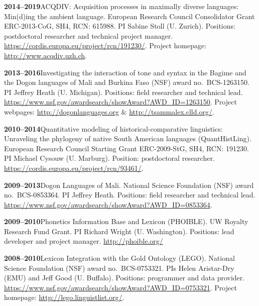 \documentclass[11pt]{article}
\newcommand{\hangpara}{
 \setlength{\parindent}{0in} %
 \hangindent=0.42in %
}
\begin{document}
\vskip 6pt
\hangpara
{\bf 2014--2019}\hspace{1ex}ACQDIV: Acquisition processes in maximally diverse languages: Min(d)ing the ambient language. European Research Council Consolidator Grant ERC-2013-CoG, SH4, RCN: 615988. PI Sabine Stoll (U. Zurich). Positions: postdoctoral researcher and technical project manager. \url{https://cordis.europa.eu/project/rcn/191230/}. Project homepage: \url{http://www.acqdiv.uzh.ch}. %

\vskip 6pt
\hangpara
{\bf 2013--2016}\hspace{1ex}Investigating the interaction of tone and syntax in the Bagime and the Dogon languages of Mali and Burkina Faso (NSF) award no.\ BCS-1263150. PI Jeffrey Heath (U. Michigan). Positions: field researcher and technical lead. \url{https://www.nsf.gov/awardsearch/showAward?AWD_ID=1263150}. Project webpages: \url{http://dogonlanguages.org} \& \url{http://tsammalex.clld.org/}.

\vskip 6pt
\hangpara
{\bf 2010--2014}\hspace{1ex}Quantitative modeling of historical-comparative linguistics: Unraveling the phylogeny of native South American languages (QuantHistLing). European Research Council Starting Grant ERC-2009-StG, SH4, RCN: 191230. PI Michael Cysouw (U. Marburg). Position: postdoctoral researcher. \url{https://cordis.europa.eu/project/rcn/93461/}.

\vskip 6pt
\hangpara
{\bf 2009--2013}\hspace{1ex}Dogon Languages of Mali. National Science Foundation (NSF) award no.\ BCS-0853364. PI Jeffrey Heath. Positions: field researcher and technical lead. \url{https://www.nsf.gov/awardsearch/showAward?AWD_ID=0853364}.

\vskip 6pt
\hangpara
{\bf 2009--2010}\hspace{1ex}Phonetics Information Base and Lexicon (PHOIBLE). UW Royalty Research Fund Grant. PI Richard Wright (U. Washington). Positions: lead developer and project manager. \url{http://phoible.org/}

\vskip 6pt
\hangpara
{\bf 2008--2010}\hspace{1ex}Lexicon Integration with the Gold Ontology (LEGO). National Science Foundation (NSF) award no.\ BCS-0753321. PIs Helen Aristar-Dry (EMU) and Jeff Good (U. Buffalo). Positions: programmer and data provider. \url{https://www.nsf.gov/awardsearch/showAward?AWD_ID=0753321}. Project homepage: \url{http://lego.linguistlist.org/}.
\end{document}
